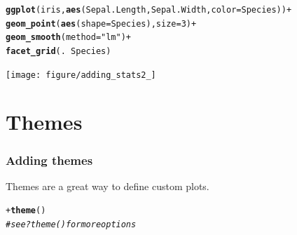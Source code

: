 \documentclass{beamer}\usepackage[]{graphicx}\usepackage[]{color}
\makeatletter
\newcommand{\hlnum}[1]{\textcolor[rgb]{0.686,0.059,0.569}{#1}}%
\newcommand{\hlstr}[1]{\textcolor[rgb]{0.192,0.494,0.8}{#1}}%
\newcommand{\hlcom}[1]{\textcolor[rgb]{0.678,0.584,0.686}{\textit{#1}}}%
\newcommand{\hlopt}[1]{\textcolor[rgb]{0,0,0}{#1}}%
\newcommand{\hlstd}[1]{\textcolor[rgb]{0.345,0.345,0.345}{#1}}%
\newcommand{\hlkwc}[1]{\textcolor[rgb]{0.333,0.667,0.333}{#1}}%
\newcommand{\hlkwd}[1]{\textcolor[rgb]{0.737,0.353,0.396}{\textbf{#1}}}%
\newenvironment{kframe}{%
 \def\at@end@of@kframe{}%
 \ifinner\ifhmode%
  \def\at@end@of@kframe{\end{minipage}}%
  \begin{minipage}{\columnwidth}%
 \fi\fi%
 \def\FrameCommand##1{\hskip\@totalleftmargin \hskip-\fboxsep
 \colorbox{shadecolor}{##1}\hskip-\fboxsep
     \hskip-\linewidth \hskip-\@totalleftmargin \hskip\columnwidth}%
 \MakeFramed {\advance\hsize-\width
   \@totalleftmargin\z@ \linewidth\hsize
   \@setminipage}}%
 {\par\unskip\endMakeFramed%
 \at@end@of@kframe}
\newenvironment{knitrout}{}{} %
\makeatother
\begin{document}

\begin{frame}[fragile]
\begin{knitrout}\footnotesize
{}\color{fgcolor}\begin{kframe}
\begin{alltt}
\hlkwd{ggplot}\hlstd{(iris,} \hlkwd{aes}\hlstd{(Sepal.Length, Sepal.Width,} \hlkwc{color} \hlstd{= Species))} \hlopt{+}
\hlkwd{geom_point}\hlstd{(}\hlkwd{aes}\hlstd{(}\hlkwc{shape} \hlstd{= Species),} \hlkwc{size} \hlstd{=} \hlnum{3}\hlstd{)} \hlopt{+}
\hlkwd{geom_smooth}\hlstd{(}\hlkwc{method} \hlstd{=} \hlstr{"lm"}\hlstd{)} \hlopt{+}
\hlkwd{facet_grid}\hlstd{(.} \hlopt{~} \hlstd{Species)}
\end{alltt}
\end{kframe}

{\centering \texttt{[image: figure/adding\_stats2\_]} 

}



\end{knitrout}
\end{frame}


\section*{Themes}
\frame{\sectionpage}


\begin{frame}[fragile]
\frametitle{Adding themes}
Themes are a great way to define custom plots.
\begin{knitrout}\footnotesize
{}\color{fgcolor}\begin{kframe}
\begin{alltt}
\hlopt{+} \hlkwd{theme}\hlstd{()}
\hlcom{# see ?theme() for more options}
\end{alltt}
\end{kframe}
\end{knitrout}
\end{frame}

\end{document}
